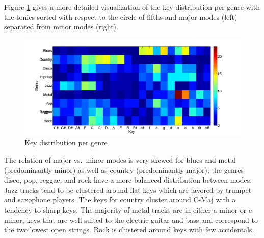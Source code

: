 \documentclass{article}
\begin{document}
Figure \ref{fig:KeyDistributionPerGenre} gives a more detailed visualization of the key distribution per genre with the tonics sorted with respect to the circle of fifths and major modes (left) separated from minor modes (right). 
\begin{figure}
    \includegraphics[scale=.2]{graph/key_distribution_colour_legend}
	\caption{Key distribution per genre}
	\label{fig:KeyDistributionPerGenre}
\end{figure}
The relation of major vs.\ minor modes is very skewed for blues and metal (predominantly minor) as well as country (predominantly major); the genres disco, pop, reggae, and rock have a more balanced distribution between modes. Jazz tracks tend to be clustered around flat keys which are favored by trumpet and saxophone players. The keys for country cluster around C-Maj with a tendency to sharp keys. The majority of metal tracks are in either a minor or e minor, keys that are well-suited to the electric guitar and bass and correspond to the two lowest open strings. Rock is clustered around keys with few accidentals.


\end{document}
